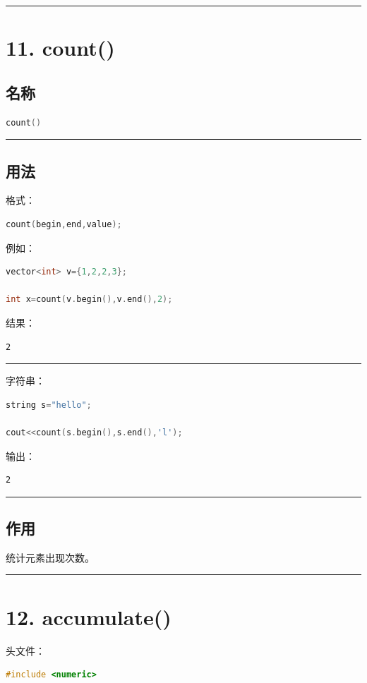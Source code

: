 \documentclass[9pt,twocolumn]{extarticle}
\begin{document}
\noindent\rule{\linewidth}{0.4pt}

\section{11. count()}

\subsection{名称}
\begin{lstlisting}[language=C++]
count()
\end{lstlisting}

\noindent\rule{\linewidth}{0.4pt}

\subsection{用法}
格式：
\begin{lstlisting}[language=C++]
count(begin,end,value);
\end{lstlisting}
例如：
\begin{lstlisting}[language=C++]
vector<int> v={1,2,2,3};

int x=count(v.begin(),v.end(),2);
\end{lstlisting}
结果：
\begin{lstlisting}
2
\end{lstlisting}

\noindent\rule{\linewidth}{0.4pt}

字符串：
\begin{lstlisting}[language=C++]
string s="hello";

cout<<count(s.begin(),s.end(),'l');
\end{lstlisting}
输出：
\begin{lstlisting}
2
\end{lstlisting}

\noindent\rule{\linewidth}{0.4pt}

\subsection{作用}
统计元素出现次数。

\noindent\rule{\linewidth}{0.4pt}

\section{12. accumulate()}

头文件：
\begin{lstlisting}[language=C++]
#include <numeric>
\end{lstlisting}
\end{document}
